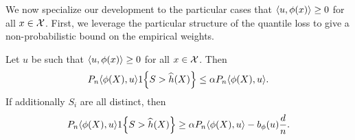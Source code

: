 \documentclass[11pt]{article}
\newcommand{\radphi}{b_{\phi}}
\newcommand{\scorerv}{S}
\begin{document}
We now specialize our development to the particular
cases that $\langle u, \phi(x)\rangle \ge 0$ for all $x \in
\mathcal{X}$.
%
First, we leverage the particular structure of the quantile
loss to give a non-probabilistic bound on the empirical
weights.
\begin{lemma}
  \label{lemma:one-directional-coverageish}
  Let $u$ be such that $\langle u, \phi(x)\rangle \ge 0$ for all $x \in \mathcal{X}$.
  Then
  \begin{equation*}
    P_n \<\phi(X), u\> \indic{\scorerv > \what{h}(X)}
    \le \alpha P_n \<\phi(X), u\>.
  \end{equation*}
  If additionally $\scorerv_i$ are all distinct, then
  \begin{equation*}
    P_n \<\phi(X), u\> \indic{\scorerv > \what{h}(X)}
    \ge \alpha P_n \<\phi(X), u\> - \radphi(u) \frac{d}{n}.
  \end{equation*}
\end{lemma}
\end{document}

